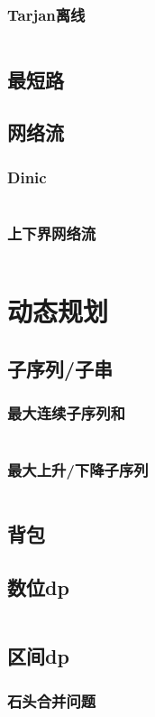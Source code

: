 \documentclass[a4paper,11pt]{article}
\begin{document}
\subsubsection{Tarjan离线}
\inputminted[]{c++}{Template/TreeGraph/LCA-Tarjan.cpp}
\subsection{最短路}

\subsection{网络流}
\subsubsection{Dinic}
\inputminted[]{c++}{Template/TreeGraph/Dinic.cpp}
\subsubsection{上下界网络流}
\inputminted[]{c++}{Template/TreeGraph/UpDownFlow.cpp}
\section{动态规划}
\subsection{子序列/子串}
\subsubsection{最大连续子序列和}
\inputminted[]{c++}{Template/DynamicProgramming/MaxSubSum.cpp}
\subsubsection{最大上升/下降子序列}
\inputminted[]{c++}{Template/DynamicProgramming/LIS.cpp}
\subsection{背包}
\subsection{数位dp}
\inputminted[]{c++}{Template/DynamicProgramming/Digital-dp.cpp}
\subsection{区间dp}
\subsubsection{石头合并问题}
\inputminted[]{c++}{Template/DynamicProgramming/Inteval-dp.cpp}
\end{document}
